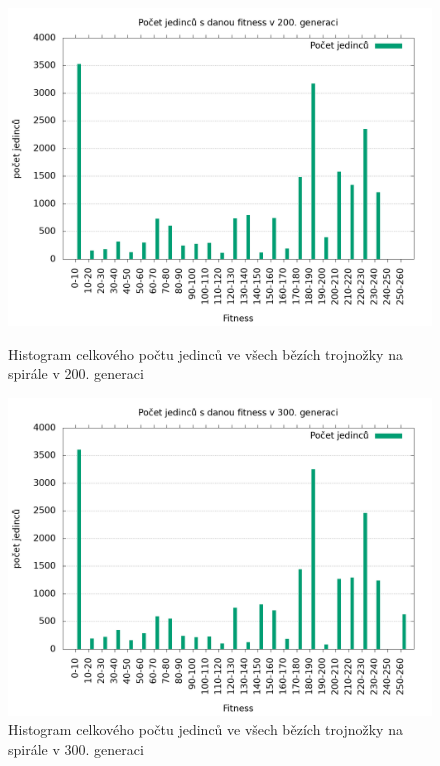 \begin{figure}[h]
    \begin{minipage}[c]{0.48\linewidth}
        \includegraphics[width=\linewidth]{obrazky/trojnozka_spirala_fitnessHistogram200.png}
        \caption{Histogram celkového počtu jedinců ve všech bězích trojnožky na spirále v 200. generaci}
        \label{fig:trojnozka_spirala_histogram_200}
    \end{minipage}
    \hfill
    \begin{minipage}[c]{0.48\linewidth}
        \includegraphics[width=\linewidth]{obrazky/trojnozka_spirala_fitnessHistogram300.png}
        \caption{Histogram celkového počtu jedinců ve všech bězích trojnožky na spirále v 300. generaci}
        \label{fig:trojnozka_spirala_histogram_300}
    \end{minipage}
\end{figure}


